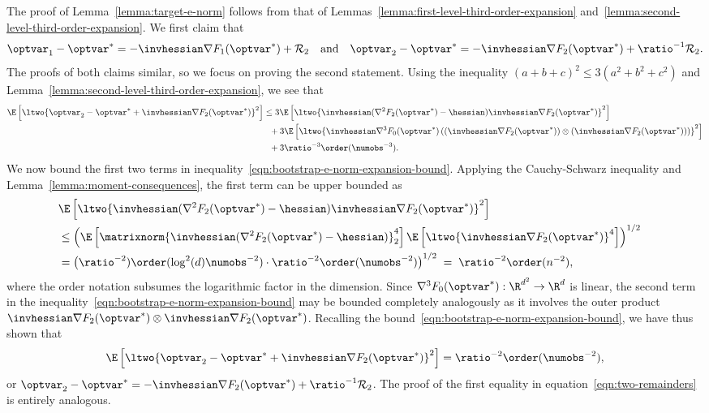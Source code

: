 \documentclass[11pt,twoside]{article}
\theoremstyle{definition}
\begin{document}
The proof of Lemma~\ref{lemma:target-e-norm} follows from that of
Lemmas~\ref{lemma:first-level-third-order-expansion}
and~\ref{lemma:second-level-third-order-expansion}. We first claim
that
\begin{equation}
  \optvar_1-\optvar^* = -\invhessian \nabla F_1(\optvar^*) + \remainder_2
  ~~~ \mbox{and} ~~~ \optvar_2-\optvar^* = -\invhessian \nabla
  F_2(\optvar^*) + \ratio^{-1}\remainder_2.
  \label{eqn:two-remainders}
\end{equation}
The proofs of both claims similar, so we focus on proving the second
statement.  Using the inequality $(a+b+c)^2\leq 3(a^2+b^2+c^2)$ and
Lemma~\ref{lemma:second-level-third-order-expansion}, we see
that
\begin{align}
  \E\left[\ltwo{\optvar_2-\optvar^* + \invhessian \nabla F_2(\optvar^*)}^2
    \right]
  & \le 3\E\left[\ltwo{\invhessian(\nabla^2 F_2(\optvar^*) - \hessian)
      \invhessian \nabla F_2(\optvar^*)}^2\right] \nonumber\\
  & ~~ + 3\E\left[\ltwo{\invhessian \nabla^3 F_0(\optvar^*)\left(
      (\invhessian \nabla F_2(\optvar^*)) \otimes
      (\invhessian \nabla F_2(\optvar^*)) \right)}^2\right] \nonumber\\
  & ~~ + 3 \ratio^{-3} \order(\numobs^{-3}).
  \label{eqn:bootstrap-e-norm-expansion-bound}
\end{align}
We now bound the first two terms in
inequality~\eqref{eqn:bootstrap-e-norm-expansion-bound}.  Applying
the Cauchy-Schwarz inequality and Lemma~\ref{lemma:moment-consequences}, the
first term can be upper bounded as
\begin{align*}
  \lefteqn{\E\left[\ltwo{\invhessian(\nabla^2 F_2(\optvar^*) - \hessian)
        \invhessian \nabla F_2(\optvar^*)}^2\right]} \\ 
  & \le \left(\E\left[\matrixnorm{\invhessian (\nabla^2 F_2(\optvar^*) -
      \hessian)}_2^4\right]
  \E\left[\ltwo{\invhessian \nabla F_2(\optvar^*)}^4\right]\right)^{1/2} \\
  & = \left(\ratio^{-2})\order(\log^2(d) \numobs^{-2})
  \cdot \ratio^{-2} \order(\numobs^{-2})\right)^{1/2} \; =
  \; \ratio^{-2} \order(n^{-2}),
\end{align*}
where the order notation subsumes the logarithmic factor in the
dimension.  Since $\nabla^3 F_0(\optvar^*) : \R^{d^2} \rightarrow
\R^d$ is linear, the second term in the
inequality~\eqref{eqn:bootstrap-e-norm-expansion-bound} may be bounded
completely analogously as it involves the outer product $\invhessian
\nabla F_2(\optvar^*) \otimes \invhessian \nabla F_2(\optvar^*)$.
%
Recalling the
bound~\eqref{eqn:bootstrap-e-norm-expansion-bound}, we have thus shown that
\begin{equation*}
  \E\left[\ltwo{\optvar_2-\optvar^* + \invhessian \nabla
      F_2(\optvar^*)}^2 \right]
  = \ratio^{-2} \order(\numobs^{-2}),
\end{equation*}
or $\optvar_2 - \optvar^* = -\invhessian \nabla F_2(\optvar^*) +
\ratio^{-1} \remainder_2$. The proof of the first equality in
equation~\eqref{eqn:two-remainders} is entirely analogous.
\end{document}
